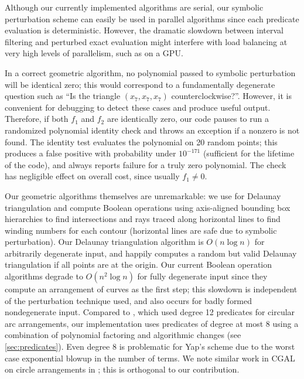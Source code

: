 \documentclass[11pt]{article}
\begin{document}
Although our currently implemented algorithms are serial, our symbolic perturbation scheme can easily be used in parallel algorithms since each predicate evaluation is deterministic.
However, the dramatic slowdown between interval filtering and perturbed exact evaluation might interfere with load balancing at very high levels of parallelism, such as on a GPU.

In a correct geometric algorithm, no polynomial passed to symbolic perturbation will be identical zero; this would correspond to a fundamentally degenerate question such as
``Is the triangle $(x_7,x_7,x_7)$ counterclockwise?''.  However, it is convenient for debugging to detect these cases and produce useful output.  Therefore,
if both $f_1$ and $f_2$ are identically zero, our code pauses to run a randomized polynomial identity check \cite{schwartz1980fast} and throws an exception if a nonzero is not found.
The identity test evaluates the polynomial on 20 random points; this produces a false positive with probability under $10^{-171}$ (sufficient for the
lifetime of the code), and always reports failure for a truly zero polynomial.  The check has negligible effect on overall cost, since usually $f_1 \ne 0$.

Our geometric algorithms themselves are unremarkable: we use \cite{amenta2003incremental} for Delaunay triangulation and compute Boolean operations using axis-aligned bounding
box hierarchies to find intersections and rays traced along horizontal lines to find winding numbers for each contour (horizontal lines are safe due to symbolic perturbation).  Our Delaunay
triangulation algorithm is $O(n \log n)$ for arbitrarily degenerate input, and happily computes a random but valid Delaunay triangulation if all points are at the origin.  Our current Boolean
operation algorithms degrade to $O(n^2 \log n)$ for fully degenerate input since they compute an arrangement of curves as the first step; this slowdown is independent of the perturbation
technique used, and also occurs for badly formed nondegenerate input.  Compared to \cite{devillers2000algebraic}, which used degree 12 predicates for circular arc arrangements,
our implementation uses predicates of degree at most 8 using a combination of polynomial factoring and algorithmic changes (see \autoref{sec:predicates}).  Even degree 8 is problematic
for Yap's scheme due to the worst case exponential blowup in the number of terms.  We note similar work in CGAL on circle arrangements in \cite{wein2006circles}; this is orthogonal to our contribution.
\end{document}
